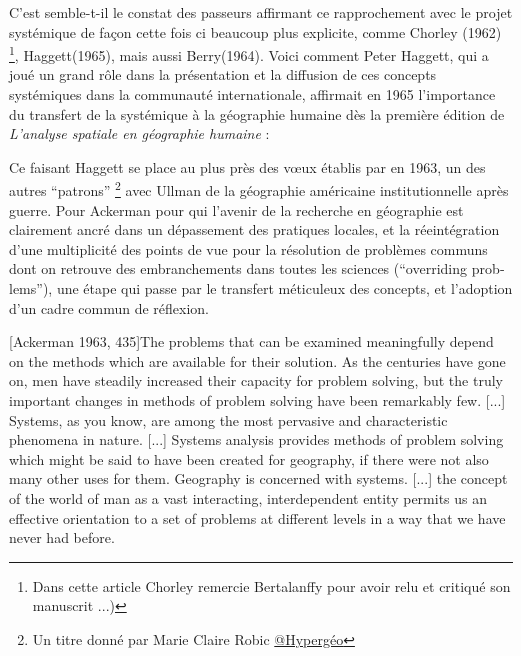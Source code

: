 C'est semble-t-il le constat des passeurs affirmant ce rapprochement avec le projet systémique de façon cette fois ci beaucoup plus explicite, comme Chorley (1962) \footnote{Dans cette article Chorley remercie Bertalanffy pour avoir relu et critiqué son manuscrit ...)}, Haggett(1965), mais aussi Berry(1964). Voici comment Peter Haggett, qui a joué un grand rôle dans la présentation et la diffusion de ces concepts systémiques dans la communauté internationale, affirmait en 1965 l'importance du transfert de la systémique à la géographie humaine dès la première édition de \textit{L’analyse spatiale en géographie humaine} : 

Ce faisant Haggett se place au plus près des vœux établis par \textcite{Ackerman1963} en 1963, un des autres \enquote{patrons} \footnote{Un titre donné par Marie Claire Robic \href{http://www.hypergeo.eu/spip.php?article469}{@Hypergéo}} avec Ullman de la géographie américaine institutionnelle après guerre. Pour Ackerman pour qui l'avenir de la recherche en géographie est clairement ancré dans un dépassement des pratiques locales, et la réeintégration d'une multiplicité des points de vue pour la résolution de problèmes communs dont on retrouve des embranchements dans toutes les sciences (\foreignquote{english}{overriding problems}), une étape qui passe par le transfert méticuleux des concepts, et l'adoption d'un cadre commun de réflexion.

[Ackerman 1963, 435]{The problems that can be examined meaningfully depend on the methods which are available for their solution. As the centuries have gone on, men have steadily increased their capacity for problem solving, but the truly important changes in methods of problem solving have been remarkably few. [...] Systems, as you know, are among the most pervasive and characteristic phenomena in nature. [...] Systems analysis provides methods of problem solving which might be said to have been created for geography, if there were not also many other uses for them. Geography is concerned with systems. [...] the concept of the world of man as a vast interacting, interdependent entity permits us an effective orientation to a set of problems at different levels in a way that we have never had before.}

